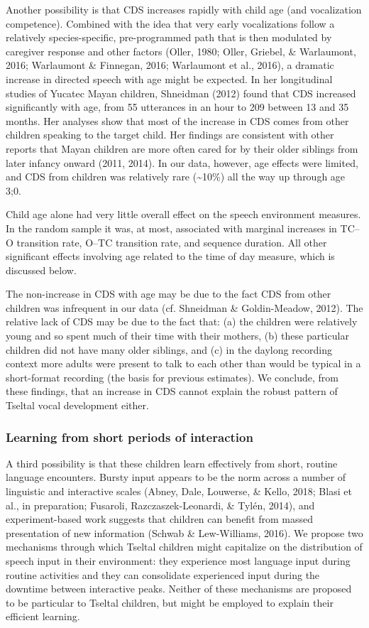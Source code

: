 \documentclass[floatsintext,man]{apa6}
\theoremstyle{definition}
\theoremstyle{definition}
\theoremstyle{definition}
\theoremstyle{remark}
\begin{document}
Another possibility is that CDS increases rapidly with child age (and
vocalization competence). Combined with the idea that very early
vocalizations follow a relatively species-specific, pre-programmed path
that is then modulated by caregiver response and other factors (Oller,
1980; Oller, Griebel, \& Warlaumont, 2016; Warlaumont \& Finnegan, 2016;
Warlaumont et al., 2016), a dramatic increase in directed speech with
age might be expected. In her longitudinal studies of Yucatec Mayan
children, Shneidman (2012) found that CDS increased significantly with
age, from 55 utterances in an hour to 209 between 13 and 35 months. Her
analyses show that most of the increase in CDS comes from other children
speaking to the target child. Her findings are consistent with other
reports that Mayan children are more often cared for by their older
siblings from later infancy onward (2011, 2014). In our data, however,
age effects were limited, and CDS from children was relatively rare
(\textasciitilde{}10\%) all the way up through age 3;0.

Child age alone had very little overall effect on the speech environment
measures. In the random sample it was, at most, associated with marginal
increases in TC--O transition rate, O--TC transition rate, and sequence
duration. All other significant effects involving age related to the
time of day measure, which is discussed below.

The non-increase in CDS with age may be due to the fact CDS from other
children was infrequent in our data (cf. Shneidman \& Goldin-Meadow,
2012). The relative lack of CDS may be due to the fact that: (a) the
children were relatively young and so spent much of their time with
their mothers, (b) these particular children did not have many older
siblings, and (c) in the daylong recording context more adults were
present to talk to each other than would be typical in a short-format
recording (the basis for previous estimates). We conclude, from these
findings, that an increase in CDS cannot explain the robust pattern of
Tseltal vocal development either.

\subsubsection{Learning from short periods of
interaction}\label{learning-from-short-periods-of-interaction}

A third possibility is that these children learn effectively from short,
routine language encounters. Bursty input appears to be the norm across
a number of linguistic and interactive scales (Abney, Dale, Louwerse, \&
Kello, 2018; Blasi et al., in preparation; Fusaroli,
Razczaszek-Leonardi, \& Tylén, 2014), and experiment-based work suggests
that children can benefit from massed presentation of new information
(Schwab \& Lew-Williams, 2016). We propose two mechanisms through which
Tseltal children might capitalize on the distribution of speech input in
their environment: they experience most language input during routine
activities and they can consolidate experienced input during the
downtime between interactive peaks. Neither of these mechanisms are
proposed to be particular to Tseltal children, but might be employed to
explain their efficient learning.
\end{document}
